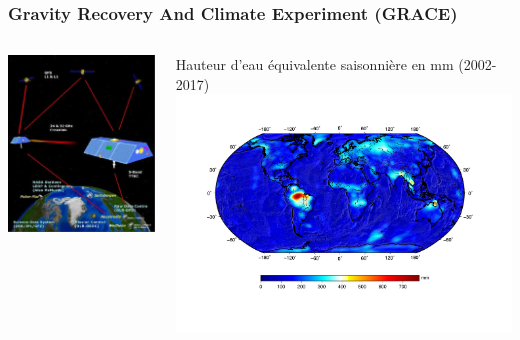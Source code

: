 \documentclass[9pt]{beamer}
\begin{document}
\begin{frame}
\frametitle{Gravity Recovery And Climate Experiment (GRACE)}

\begin{columns}
        \begin{column}{0.2\textwidth}
        \centering
          \includegraphics[width=\textwidth]{figures/GRACE_satellites.jpg}
        \end{column}
        \begin{column}{0.8\textwidth}
        \centering
        Hauteur d'eau équivalente saisonnière en mm (2002-2017) \vspace*{-1cm}
          \includegraphics[width=\textwidth]{figures/global_map_grace.pdf} 

\end{column}
\end{columns}
\end{frame}
\end{document}
